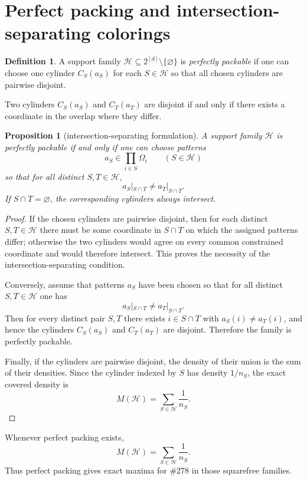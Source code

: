 \documentclass[11pt]{article}
\newtheorem{proposition}[theorem]{Proposition}
\theoremstyle{definition}
\newtheorem{definition}[theorem]{Definition}
\newcommand{\Hh}{\mathcal H}
\begin{document}
\section{Perfect packing and intersection-separating colorings}
\begin{definition}
A support family \(\Hh\subseteq 2^{[d]}\setminus\{\varnothing\}\) is \emph{perfectly packable} if one can choose one cylinder \(C_S(a_S)\) for each \(S\in\Hh\) so that all chosen cylinders are pairwise disjoint.
\end{definition}

Two cylinders \(C_S(a_S)\) and \(C_T(a_T)\) are disjoint if and only if there exists a coordinate in the overlap where they differ.

\begin{proposition}[intersection-separating formulation]
A support family \(\Hh\) is perfectly packable if and only if one can choose patterns
\[
a_S\in \prod_{i\in S}\Omega_i
\qquad (S\in \Hh)
\]
so that for all distinct \(S,T\in\Hh\),
\[
a_S|_{S\cap T}\neq a_T|_{S\cap T}.
\]
If \(S\cap T=\varnothing\), the corresponding cylinders always intersect.
\end{proposition}

\begin{proof}
If the chosen cylinders are pairwise disjoint, then for each distinct \(S,T\in \Hh\) there must be some coordinate in \(S\cap T\) on which the assigned patterns differ; otherwise the two cylinders would agree on every common constrained coordinate and would therefore intersect. This proves the necessity of the intersection-separating condition.

Conversely, assume that patterns \(a_S\) have been chosen so that for all distinct \(S,T\in \Hh\) one has
\[
a_S|_{S\cap T}\neq a_T|_{S\cap T}.
\]
Then for every distinct pair \(S,T\) there exists \(i\in S\cap T\) with \(a_S(i)\neq a_T(i)\), and hence the cylinders \(C_S(a_S)\) and \(C_T(a_T)\) are disjoint. Therefore the family is perfectly packable.

Finally, if the cylinders are pairwise disjoint, the density of their union is the sum of their densities. Since the cylinder indexed by \(S\) has density \(1/n_S\), the exact covered density is
\[
M(\Hh)=\sum_{S\in \Hh}\frac1{n_S}.
\]
\end{proof}

Whenever perfect packing exists,
\[
M(\Hh)=\sum_{S\in \Hh}\frac1{n_S}.
\]
Thus perfect packing gives exact maxima for \#278 in those squarefree families.
\end{document}
